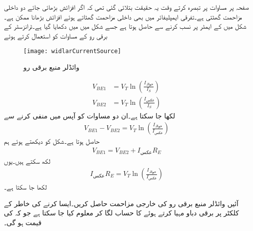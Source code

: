 صفحہ  پر مساوات  پر تبصرہ کرتے وقت یہ حقیقت بتلائی گئی تھی کہ اگر افزائش بڑھائی جائے دو داخلی مزاحمت گھٹتی ہے۔تفرقی ایمپلیفائر میں بھی داخلی مزاحمت گھٹاتے ہوئے افزائش بڑھانا ممکن ہے۔
شکل  میں  کے ایمٹر پر  نسب کرنے سے   حاصل ہوتا ہے جسے شکل  میں میں دکھایا گیا ہے۔ٹرانزسٹر کے برقی رو کے مساوات کو استعمال کرتے ہوئے 
\begin{figure}
\centering
\texttt{[image: widlarCurrentSource]}
\caption{وائڈلر منبع برقی رو}
\label{شکل_تفرقی_وائڈلر_پیداکار_برقی_رو}
\end{figure}
%
\begin{align*}
V_{BE1}&=V_T \ln \left(\frac{I_{\textrm{حوالہ}}}{I_S} \right)\\
V_{BE2}&=V_T \ln \left(\frac{I_{\textrm{عکس}}}{I_S} \right)
\end{align*}
لکھا جا سکتا ہے۔ان دو مساوات کو آپس میں منفی کرنے سے
\begin{align*}
V_{BE1}-V_{BE2}=V_T \ln \left(\frac{I_{\textrm{حوالہ}}}{I_{\textrm{عکس}}} \right)
\end{align*}
حاصل ہوتا ہے۔شکل کو دیکھتے ہوئے ہم 
\begin{align*}
V_{BE1}=V_{BE2}+I_{\textrm{عکس}} R_E
\end{align*}
لکھ سکتے ہیں۔یوں
\begin{align}\label{مساوات_تفرقی_وائڈلر_مزاحمت}
I_{\textrm{عکس}} R_E=V_T \ln \left(\frac{I_{\textrm{حوالہ}}}{I_{\textrm{عکس}}} \right)
\end{align}
لکھا جا سکتا ہے۔

آئیں وائڈلر منبع برقی رو کی خارجی مزاحمت  حاصل کریں۔ایسا کرنے کی خاطر  کے کلکٹر پر  برقی دباو مہیا کرتے ہوئے  کا حساب لگا کر  معلوم کیا جا سکتا ہے جو کہ  کی قیمت ہو گی۔

